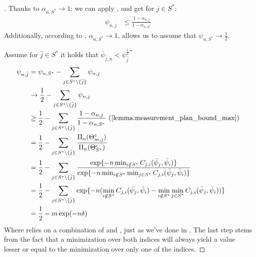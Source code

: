   \begin{proof}[]
    Thanks to $\alpha_{n, S^*} \rightarrow 1$: we can apply
    , and get for $j \in S^*$:
    \begin{align}
      \psi_{n, j} &\leq \frac{1 - \alpha_{n, j}}{1 - \alpha_{n, S^*}}
    \end{align}
    Additionally, according to , $\alpha_{n, S^*}
    \rightarrow 1$, allows us to assume that $\psi_{n, S^*} \rightarrow
    \frac{1}{2}$.

    Assume for $\hat{j} \in S^*$ it holds that $\bar{\psi}_{\hat{j}, n} <
    \psi^{\frac{1}{2}*}_{\hat{j}}$
    \begin{align}
      \psi_{n, \hat{j}} &= \psi_{n, S^*} - \sum_{j \in S^* \setminus
          \{\hat{j}\}} \psi_{n, j}\\
        &\rightarrow \frac{1}{2} - \sum_{j \in S^* \setminus \{\hat{j}\}}
            \psi_{n, j}\\
        &\geq \frac{1}{2} - \sum_{j \in S^* \setminus \{\hat{j}\}} \frac{1 -
            \alpha_{n, j}}{1 - \alpha_{n, S^*}} \text{
            (\Cref{lemma:measurement_plan_bound_max})} \\
        &= \frac{1}{2} - \sum_{j \in S^* \setminus \{\hat{j}\}}
            \frac{\Pi_n(\Theta_{m, j}^c)}{\Pi_n(\Theta_{S^*}^c)} \\
        &= \frac{1}{2} - \sum_{j \in S^* \setminus \{\hat{j}\}} \frac{\exp\{-n
            \min_{i \notin S^*} C_{j, i}(\bar{\psi}_j, \bar{\psi}_i) \}}{\exp\{-
            n \min_{i \notin S^*} \min_{j \in S^*} C_{j, i}(\bar{\psi}_j,
            \bar{\psi}_i) \}} \label{eq:like_lemma10}\\
        &= \frac{1}{2} - \sum_{j \in S^* \setminus \{\hat{j}\}} \exp\{-
            n(\min_{i \notin S^*} C_{j, i}(\bar{\psi}_j, \bar{\psi}_i) -
            \min_{i \notin S^*} \min_{j \in S^*} C_{j, i}(\bar{\psi}_j,
            \bar{\psi}_i))\} \\
        &= \frac{1}{2} - m \exp(-n\delta)
    \end{align}
    Where  relies on a combination of
     and , just as we've done in
    . The last step stems from the fact that a
    minimization over both indices will always yield a value lesser or equal to
    the minimization over only one of the indices.
  \end{proof}
